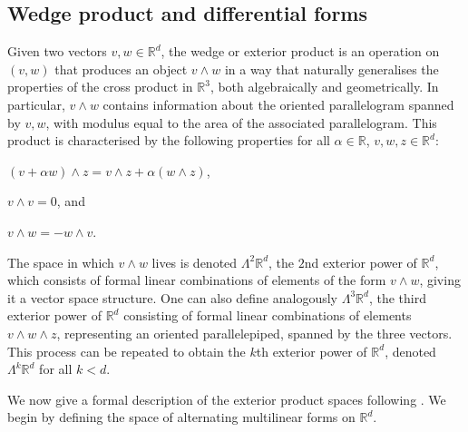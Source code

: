 \documentclass[sn-mathphys-num]{sn-jnl}%
\theoremstyle{thmstyleone}%
\theoremstyle{thmstyletwo}%
\theoremstyle{thmstylethree}%
\numberwithin{remark}{section}
\numberwithin{definition}{section}
\numberwithin{equation}{section}
\numberwithin{theorem}{section}
\newcommand{\R}{\ensuremath{\mathbb{R}}}%
\begin{document}
    \subsection{Wedge product and differential forms}
Given two vectors $v,w \in \R^{d}$, the wedge  or exterior product is an operation on $(v,w)$ that produces an object $v\wedge w$ in a way that naturally generalises the properties of the cross product in $\R^{3}$, both algebraically and geometrically. In particular, $v\wedge w$ contains information about the oriented parallelogram spanned by $v,w$, with modulus equal to the area of the associated parallelogram. This product is characterised by the following properties for all $\alpha \in \R$, $v,w,z \in \R^d$:
\begin{description}\label{items}
    \item [$\wedge$ is bilinear:] $(v+\alpha w) \wedge z = v \wedge z + \alpha(w \wedge z)$,
    \item[$\wedge$ is alternating:] $v \wedge v = 0$, and
    \item[$\wedge$ is antisymmetric:] $v \wedge w = -w  \wedge v$.
\end{description}
 The space in which $v\wedge w $ lives is denoted $\Lambda^{2}\R^{d}$, the $2$nd exterior power of $\R^{d}$, which consists of formal linear combinations of elements of the form $v\wedge w$, giving it a vector space structure. One can also define analogously $\Lambda^{3}\R^{d}$, the third exterior power of $\R^{d}$ consisting of formal linear combinations of elements $v\wedge w\wedge z$, representing an oriented parallelepiped, spanned by the three vectors. This process can be repeated to obtain the $k$th exterior power of $\R^{d}$, denoted $\Lambda^{k}\R^{d}$ for all $k<d$. 

We now give a formal description of the exterior product spaces following \cite{Sternberg,FrankMorgan,NCThesis}. We begin by defining the space of alternating multilinear forms on $\R^{d}$.


\end{document}
